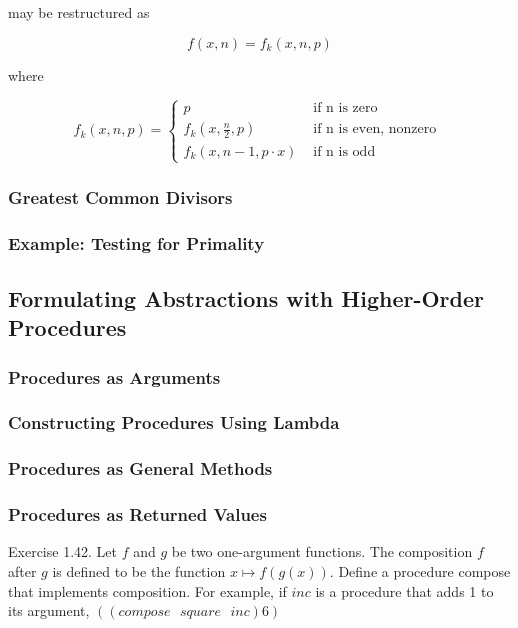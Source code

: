 may be restructured as

\begin{equation}
f\left(x,n\right) = f_{k}\left(x,n,p\right)
\label{eq:fast_expt_fast}
\end{equation}

where

\begin{equation}
f_{k}\left(x,n,p\right) =
\begin{cases}
p & \mbox{ if n is zero } \\
f_{k}\left(x,\frac{n}{2},p\right) & \mbox{ if n is even, nonzero } \\
f_{k}\left(x,n-1,p \cdot x\right) & \mbox{ if n is odd }
\end{cases}
\label{eq:fast_expt_fast_recur}
\end{equation}

            \subsubsection{Greatest Common Divisors}
            \subsubsection{Example: Testing for Primality}
        \subsection{Formulating Abstractions with Higher-Order Procedures}
            \subsubsection{Procedures as Arguments}
            \subsubsection{Constructing Procedures Using Lambda}
            \subsubsection{Procedures as General Methods}
            \subsubsection{Procedures as Returned Values}
Exercise 1.42. Let $f$ and $g$ be two one-argument functions. The composition $f$ after $g$ is defined to be the function $x \mapsto f\left(g\left(x\right)\right)$. Define a procedure compose that implements composition. For example, if $inc$ is a procedure that adds 1 to its argument, $\left(\left(compose\mbox{ }square\mbox{ }inc\right) 6\right)$


